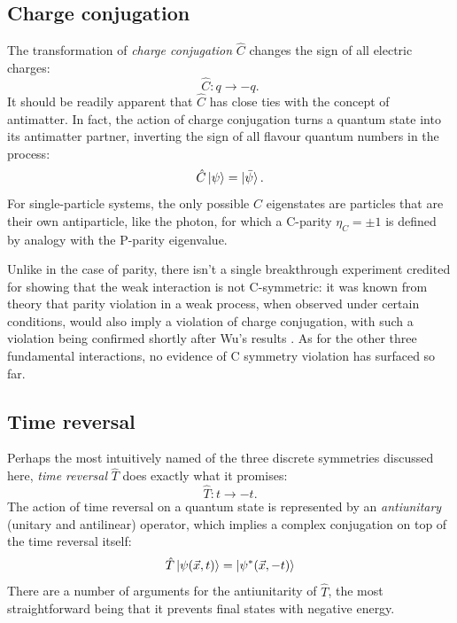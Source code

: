 \subsection{Charge conjugation}
\label{sec:C-symmetry}
The transformation of \textit{charge conjugation} $\hat{C}$ changes the sign of all electric charges:
\begin{equation}
	\hat{C} : q \rightarrow -q.
\end{equation}
It should be readily apparent that $\hat{C}$ has close ties with the concept of antimatter.
In fact, the action of charge conjugation turns a quantum state into its antimatter partner, inverting the sign of all flavour quantum numbers in the process:
\begin{equation}
	\hat{C} \ket{\psi} = \ket{\bar{\psi}}.
\end{equation}
For single-particle systems, the only possible $\hat{C}$ eigenstates are particles that are their own antiparticle, like the photon, for which a C-parity $\eta_C = \pm 1$ is defined by analogy with the P-parity eigenvalue.

Unlike in the case of parity, there isn't a single breakthrough experiment credited for showing that the weak interaction is not C-symmetric:
it was known from theory that parity violation in a weak process, when observed under certain conditions, would also imply a violation of charge conjugation, with such a violation being confirmed shortly after Wu's results \cite{cviolation}.
As for the other three fundamental interactions, no evidence of C symmetry violation has surfaced so far.

\subsection{Time reversal}
Perhaps the most intuitively named of the three discrete symmetries discussed here, \textit{time reversal} $\hat{T}$ does exactly what it promises:
\begin{equation}
	\hat{T} : t \rightarrow -t .
\end{equation}
The action of time reversal on a quantum state is represented by an \textit{antiunitary} (unitary and antilinear) operator, which implies a complex conjugation on top of the time reversal itself:
\begin{equation}
	\hat{T} \ket{\psi(\vec{x},t)} = \ket{\psi^*(\vec{x},-t)}
\end{equation}
There are a number of arguments for the antiunitarity of $\hat{T}$, the most straightforward being that it prevents final states with negative energy.

